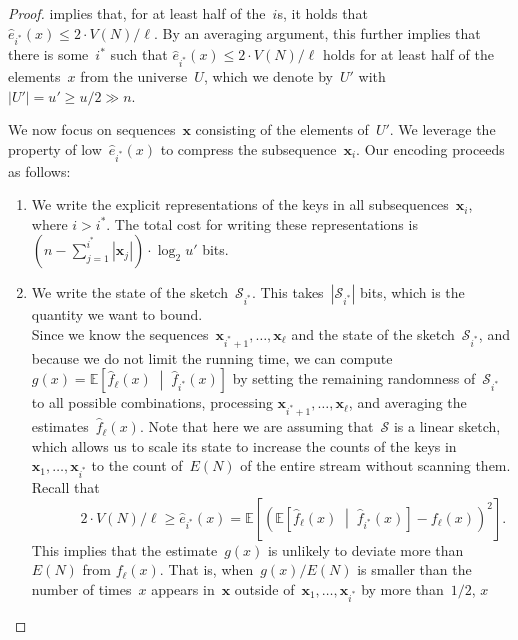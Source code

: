 \documentclass[sigconf]{acmart}
\begin{document}
\begin{proof}
     implies that, for at least half of the~$i$s, it
    holds that $\hat{e}_{i^*}(x) \leq 2 \cdot V(N)/\ell$. By an averaging
    argument, this further implies that there is some~$i^*$ such that
    $\hat{e}_{i^*}(x) \leq 2 \cdot V(N)/\ell$ holds for at least half of the
    elements~$x$ from the universe~$U$, which we denote by~$U'$ with $|U'| = u'
    \geq u/2 \gg n$. 

    We now focus on sequences~$\mathbf{x}$ consisting of the elements of~$U'$.
    We leverage the property of low~$\hat{e}_{i^*}(x)$ to compress the
    subsequence~$\mathbf{x}_i$. Our encoding proceeds as follows:
    \begin{enumerate}[label=(\roman*)]
        \item We write the explicit representations of the keys in all
            subsequences~$\mathbf{x}_i$, where $i > i^*$. The total cost for
            writing these representations is~$(n-\sum_{j=1}^{i^*}
            |\mathbf{x}_j|) \cdot \log_2 u'$ bits.
        \item We write the state of the sketch~$\mathcal{S}_{i^*}$. This
            takes~$|\mathcal{S}_{i^*}|$ bits, which is the quantity we want to
            bound. \\
            Since we know the sequences~$\mathbf{x}_{i^*+1}, \dots,
            \mathbf{x}_\ell$ and the state of the sketch~$\mathcal{S}_{i^*}$,
            and because we do not limit the running time, we can
            compute~$g(x)=\mathbb{E}\left[ \hat{f}_\ell(x) \;\middle|\;
            \hat{f}_{i^*}(x) \right]$ by setting the remaining randomness
            of~$\mathcal{S}_{i^*}$ to all possible combinations, processing
            $\mathbf{x}_{i^*+1}, \dots, \mathbf{x}_\ell$, and averaging the
            estimates~$\hat{f}_\ell(x)$. Note that here we are assuming
            that~$\mathcal{S}$ is a linear sketch, which allows us to scale its
            state to increase the counts of the keys
            in~$\mathbf{x}_1,\dots,\mathbf{x}_{i^*}$ to the count of~$E(N)$
            of the entire stream without scanning them. Recall that 
            $$ \;\;\;\;\;\;\;\;\;\;\; 2 \cdot V(N)/\ell \geq \hat{e}_{i^*}(x) = \mathbb{E}\left[ \left( \mathbb{E}\left[ \hat{f}_\ell(x) \;\middle|\; \hat{f}_{i^*}(x) \right] - f_\ell(x) \right)^2 \right]. $$
            This implies that the estimate~$g(x)$ is unlikely to deviate more
            than~$E(N)$ from $f_\ell(x)$. That is, when~$g(x)/E(N)$ is smaller
            than the number of times~$x$ appears in~$\mathbf{x}$ outside
            of~$\mathbf{x}_1,\dots,\mathbf{x}_{i^*}$ by more than~$1/2$, $x$

\end{enumerate}
\end{proof}
\end{document}

